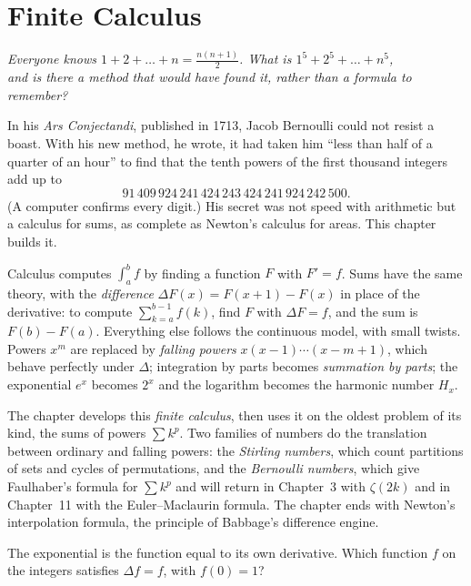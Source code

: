 \chapter{Finite Calculus}

\begin{center}\itshape
Everyone knows $1+2+\dots+n=\frac{n(n+1)}2$. What is $1^5+2^5+\dots+n^5$,\\
and is there a method that would have found it, rather than a formula to remember?
\end{center}

In his \emph{Ars Conjectandi}, published in 1713, Jacob Bernoulli could not resist a boast. With his new method, he wrote, it had taken him
``less than half of a quarter of an hour'' to find that the tenth powers of the first thousand integers add up to
\[
91\,409\,924\,241\,424\,243\,424\,241\,924\,242\,500.
\]
(A computer confirms every digit.) His secret was not speed with arithmetic but a calculus for sums, as complete as Newton's calculus for areas.
This chapter builds it.

Calculus computes $\int_a^bf$ by finding a function $F$ with $F'=f$. Sums have the same theory, with the
\emph{difference} $\Delta F(x)=F(x+1)-F(x)$ in place of the derivative: to compute $\sum_{k=a}^{b-1}f(k)$, find $F$
with $\Delta F=f$, and the sum is $F(b)-F(a)$. Everything else follows the continuous model, with small twists.
Powers $x^m$ are replaced by \emph{falling powers} $x(x-1)\cdots(x-m+1)$, which behave perfectly under $\Delta$;
integration by parts becomes \emph{summation by parts}; the exponential $e^x$ becomes $2^x$ and the logarithm
becomes the harmonic number $H_x$.

The chapter develops this \emph{finite calculus}, then uses it on the oldest problem of its kind, the sums of
powers $\sum k^p$. Two families of numbers do the translation between ordinary and falling powers: the
\emph{Stirling numbers}, which count partitions of sets and cycles of permutations, and the \emph{Bernoulli
numbers}, which give Faulhaber's formula for $\sum k^p$ and will return in Chapter~3 with $\zeta(2k)$ and in
Chapter~11 with the Euler--Maclaurin formula. The chapter ends with Newton's interpolation formula, the principle
of Babbage's difference engine.

\begin{think}
The exponential is the function equal to its own derivative. Which function $f$ on the integers satisfies
$\Delta f=f$, with $f(0)=1$?
\end{think}

